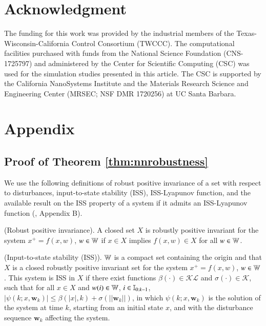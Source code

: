 \documentclass[preprint,5p, twocolumn, authoryear]{elsarticle}
\begin{document}
\section*{Acknowledgment}
The funding for this work was provided by the industrial
members of the Texas-Wisconsin-California Control 
Consortium (TWCCC).
The computational facilities purchased with funds from the National Science Foundation (CNS-1725797) and 
administered by the Center for Scientific Computing (CSC) was used for the simulation 
studies presented in this article. 
The CSC is supported by the California NanoSystems Institute and the Materials 
Research Science and Engineering Center 
(MRSEC; NSF DMR 1720256) at UC Santa Barbara.




\section*{Appendix}
\renewcommand{\thesubsection}{\Alph{subsection}}

\subsection{Proof of Theorem \ref{thm:nnrobustness}} \label{app:theorem1}

We use the following
definitions of
robust positive invariance of a set
with respect to disturbances, 
input-to-state stability (ISS), ISS-Lyapunov function,
and the available result 
on the ISS property of a system if it admits 
an ISS-Lyapunov function
(\cite*{jiang:wang:2001, 
rawlings:mayne:diehl:2017}, Appendix B).

\begin{definition} \label{def:robust_pos_invariance}
(Robust positive invariance). A closed set $X$ is 
robustly positive invariant for the system $x^+ = f(x, w)$, 
$w \in \mathbb{W}$ if $x \in X$ 
implies $f(x, w) \in X$ for all $w \in \mathbb{W}$.
\end{definition}

\begin{definition} \label{def:iss}
(Input-to-state stability (ISS)). $\mathbb{W}$ is a compact 
set containing the origin and that $X$ is a closed robustly
positive invariant set for the 
system $x^+ = f(x, w)$, $w \in \mathbb{W}$. This
system is ISS in $X$ if there exist functions 
$\beta(\cdot) \in \mathcal{K}\mathcal{L}$ and 
$\sigma(\cdot) \in \mathcal{K}$, such that for all
$x \in X$ and $w(i) \in \mathbb{W}$, $i \in \mathbb{I}_{0:k-1}$, 
$\vert \psi(k; x, \mathbf{w}_k) \vert \leq \beta(\vert x\vert, k) 
+ \sigma(\vert \vert \mathbf{w}_k\vert \vert)$, in which 
$\psi(k; x, \mathbf{w}_k)$ is the solution of the system 
at time $k$, starting from an initial state $x$, and with the
disturbance sequence $\mathbf{w}_k$ affecting the system.
\end{definition}
\end{document}
